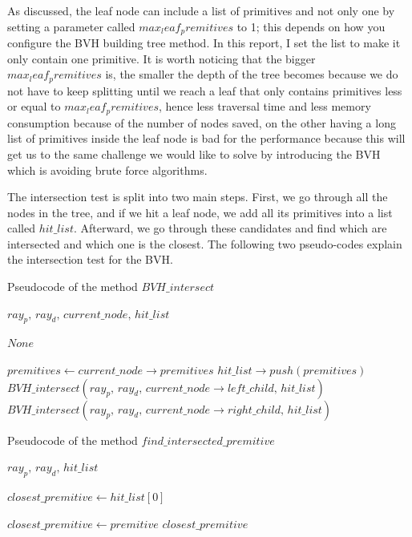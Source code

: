 \documentclass[11pt,a4paper]{article}
\begin{document}
As discussed, the leaf node can include a list of primitives and not only one by setting a parameter called $max_leaf_premitives$ to 1; this depends on how you configure the BVH building tree method. In this report, I set the list to make it only contain one primitive. It is worth noticing that the bigger $max_leaf_premitives$ is, the smaller the depth of the tree becomes because we do not have to keep splitting until we reach a leaf that only contains primitives less or equal to $max_leaf_premitives$, hence less traversal time and less memory consumption because of the number of nodes saved, on the other having a long list of primitives inside the leaf node is bad for the performance because this will get us to the same challenge we would like to solve by introducing the BVH which is avoiding brute force algorithms.
\\
\noindent

The intersection test is split into two main steps. First, we go through all the nodes in the tree, and if we hit a leaf node, we add all its primitives into a list called $hit\_list$. Afterward, we go through these candidates and find which are intersected and which one is the closest. The following two pseudo-codes explain the intersection test for the BVH. 

\begin{algorithm}[H]
\caption{Pseudocode of the method $BVH\_intersect$}\label{alg:alg1}
\begin{algorithmic}
\Require $ray_p,\, ray_d,\, current\_node,\, hit\_list$

\Return $None$

\State $premitives \gets current\_node \rightarrow premitives $ 
    \State $hit\_list \rightarrow push(premitives)$
\Else
\State $BVH\_intersect(ray_p,\, ray_d,\, current\_node \rightarrow left\_child,\, hit\_list)$
\State $BVH\_intersect(ray_p,\, ray_d,\, current\_node \rightarrow right\_child,\, hit\_list)$
\EndIf
\end{algorithmic}
\end{algorithm}


\begin{algorithm}[H]
\caption{Pseudocode of the method $find\_intersected\_premitive$}\label{alg:alg2}
\begin{algorithmic}
\Require $ray_p,\, ray_d,\, hit\_list$

\State $closest\_premitive \gets hit\_list[0]$
 
			\State $closest\_premitive \gets premitive$
		\EndIf
	\EndIf
\EndFor
\State \Return $closest\_premitive$
\end{algorithmic}
\end{algorithm}
\clearpage
\end{document}
